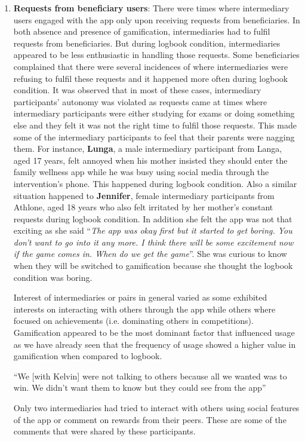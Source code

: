 \begin{enumerate}
\item{\textbf{Requests from beneficiary users}}: There were times where intermediary users engaged with the app only upon receiving requests from beneficiaries. In both absence and presence of gamification, intermediaries had to fulfil requests from beneficiaries.  But during logbook condition, intermediaries appeared to be less enthusiastic in handling those requests. Some beneficiaries complained that there were several incidences of where intermediaries were refusing to fulfil these requests and it happened more often during logbook condition. It was observed that in most of these cases, intermediary participants' autonomy was violated as requests came at times where intermediary participants were either studying for exams or doing something else and they felt it was not the right time to fulfil those requests. This made some of the intermediary participants to feel that their parents were nagging them. For instance, \textbf{Lunga}, a male intermediary participant from Langa, aged 17 years, felt annoyed when his mother insisted they should enter the family wellness app while he was busy using social media through the intervention's phone. This happened during logbook condition. Also a similar situation happened to \textbf{Jennifer}, female intermediary participants from Athlone, aged 18 years who also felt irritated by her mother's constant requests during logbook condition. In addition she felt the app was not that exciting as she said ``\emph{The app was okay first but it started to get boring. You don't want to go into it any more. I think there will be some excitement now if the game comes in. When do we get the game}''. She was curious to know when they will be switched to gamification because she thought the logbook condition was boring.

Interest of intermediaries or pairs in general varied as some exhibited interests on interacting with others through the app while others where focused on achievements (i.e. dominating others in competitions). Gamification appeared to be the most dominant factor that influenced usage as we have already seen that the frequency of usage showed a higher value in gamification when compared to logbook. 

 {``We [with Kelvin] were not talking to others because all we wanted was to win. We didn't want them to know but they could see from the app''}
 
Only two intermediaries had tried to interact with others using social features of the app or comment on rewards from their peers. These are some of the comments that were shared by these participants.


\end{enumerate}
